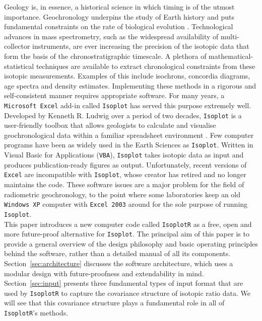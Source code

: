 \documentclass{article}
\begin{document}
Geology is, in essence, a historical science in which timing is of the
utmost importance.  Geochronology underpins the study of Earth history
and puts fundamental constraints on the rate of biological evolution
\citep{chen2012,gradstein2012}. Technological advances in mass
spectrometry, such as the widespread availability of multi-collector
instruments, are ever increasing the precision of the isotopic data
that form the basis of the chronostratigraphic timescale. A plethora
of mathematical-statistical techniques are available to extract
chronological constraints from these isotopic measurements. Examples
of this include isochrons, concordia diagrams, age spectra and density
estimates. Implementing these methods in a rigorous and
self-consistent manner requires appropriate software. For many years,
a \texttt{Microsoft Excel} add-in called \texttt{Isoplot} has served
this purpose extremely well.\\

Developed by Kenneth R. Ludwig over a period of two decades,
\texttt{Isoplot} is a user-friendly toolbox that allows geologists to
calculate and visualise geochronological data within a familiar
spreadsheet environment \citep{ludwig1988, ludwig1999, ludwig2003,
  ludwig2012}.  Few computer programs have been as widely used in the
Earth Sciences as \texttt{Isoplot}. Written in Visual Basic for
Applications (\texttt{VBA}), \texttt{Isoplot} takes isotopic data as
input and produces publication-ready figures as output. Unfortunately,
recent versions of \texttt{Excel} are incompatible with
\texttt{Isoplot}, whose creator has retired and no longer maintains
the code. These software issues are a major problem for the field of
radiometric geochronology, to the point where some laboratories keep
an old \texttt{Windows~XP} computer with \texttt{Excel~2003} around
for the sole purpose of running \texttt{Isoplot}.\\

This paper introduces a new computer code called \texttt{IsoplotR} as
a free, open and more future-proof alternative for \texttt{Isoplot}.
The principal aim of this paper is to provide a general overview of
the design philosophy and basic operating principles behind the
software, rather than a detailed manual of all its components.
Section~\ref{sec:architecture} discusses the software architecture,
which uses a modular design with future-proofness and extendability in
mind. Section~\ref{sec:input} presents three fundamental types of
input format that are used by \texttt{IsoplotR} to capture the
covariance structure of isotopic ratio data. We will see that this
covariance structure plays a fundamental role in all of
\texttt{IsoplotR}'s methods.\\
\end{document}
